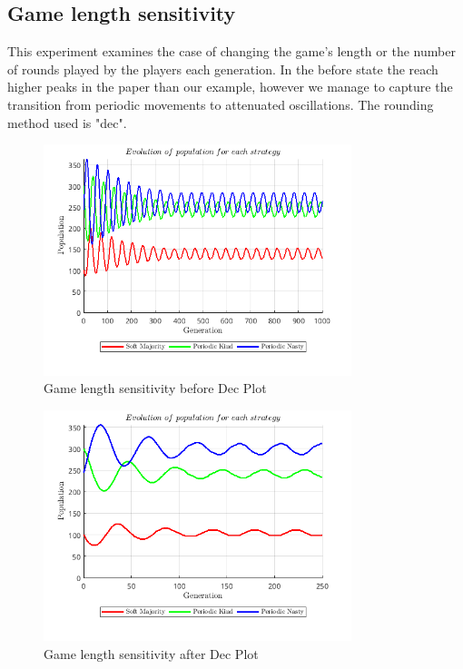 \subsection{Game length sensitivity}
This experiment examines the case of changing the game's length or the number of rounds played by the players each generation. In the before state the reach higher peaks in the paper than our example, however we manage to capture the transition from periodic movements to attenuated oscillations. The rounding method used is "dec".
\begin{figure}[H]
    \centering
    \includegraphics[width=0.8\textwidth]{media/meetings/game_length_sensitivity_before_dec.png}
    \caption{Game length sensitivity before Dec Plot}
\end{figure}
\begin{figure}[H]
    \centering
    \includegraphics[width=0.8\textwidth]{media/meetings/game_length_sensitivity_after_dec.png}
    \caption{Game length sensitivity after Dec Plot}
\end{figure}

